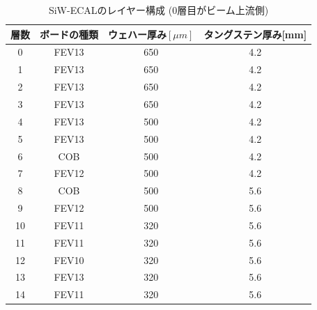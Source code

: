 \begin{table}[H]
 \centering
 \begin{tabular}{|c|c|c|c|}
 \hline
層数 & ボードの種類 & ウェハー厚み$[\mu m]$ & タングステン厚み[mm]\\
 \hline
 \hline
0 & FEV13 & 650 & 4.2\\
1 & FEV13 & 650 & 4.2\\
2 & FEV13 & 650 & 4.2\\
3 & FEV13 & 650 & 4.2\\
4 & FEV13 & 500 & 4.2\\
5 & FEV13 & 500 & 4.2\\
6 & COB & 500 & 4.2\\
7 & FEV12 & 500 & 4.2\\
8 & COB & 500 & 5.6\\
9 & FEV12 & 500 & 5.6\\
10 & FEV11 & 320 & 5.6\\
11 & FEV11 & 320 & 5.6\\
12 & FEV10 & 320 & 5.6\\
13 & FEV13 & 320 & 5.6\\
14 & FEV11 & 320 & 5.6\\
 \hline
 \end{tabular}
 \label{layer}
 \caption{SiW-ECALのレイヤー構成 (0層目がビーム上流側) }
\end{table}

